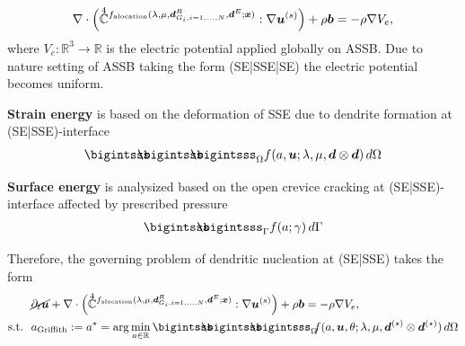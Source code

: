 \documentclass[25pt, a0paper,
portrait,
margin=2mm, 
innermargin=2mm, 
blockverticalspace=7mm, %
colspace=2mm, %
subcolspace=0mm]{tikzposter}
\begin{document}
{\begin{minipage}{0.43\textwidth}
\begin{mdframed}
\begin{align*}
				\nabla \cdot
				\Big(
				\accentset{\scriptstyle 4}{\mathbb{C}}^{f_{\text{alocation}}(\lambda,\mu,{\boldsymbol{\mathnormal d}}^{R}_{G_i, i=1,\dots,N},{\boldsymbol{\mathnormal d}}^{E};{\boldsymbol{\mathnormal x}})}
				:\nabla{\boldsymbol{\mathnormal u}}^{(s)}
				\Big)
				+ \rho{\boldsymbol{\mathnormal b}}
				= -\rho\nabla V_{e},
			\end{align*}
			where $V_{e}: \mathbb{R}^{3}\to\mathbb{R}$
			is the electric potential applied globally on ASSB.
			Due to nature setting of ASSB taking the form 
			(SE|SSE|SE)
			the electric potential becomes uniform.\\
			\vspace{-0.6cm}
		\end{mdframed}
		\begin{minipage}{0.5\textwidth}
			\begin{mdframed}
				\textbf{Strain energy} is based on the 
				deformation of SSE
				due to dendrite formation 
				at (SE|SSE)-interface 
				\begin{align*}
					\bigintsss\!\!\!\!\!\!\bigintsss\!\!\!\!\!\!\bigintsss_{\Omega}
					f(a,\bm{u};\lambda,\mu,\bm{d}\otimes\bm{d}) \, d\Omega 
				\end{align*}
			\end{mdframed}
		\end{minipage}
		\hfill 
		\begin{minipage}{0.49\textwidth}
			\begin{mdframed}
				\textbf{Surface energy}
				is analysized based on
				the open crevice 
				cracking at (SE|SSE)-interface
				affected by prescribed pressure
				\begin{align*} 
					\bigintsss\!\!\!\!\!\!\bigintsss_{\Gamma} f(a;\gamma) \, d\Gamma
				\end{align*}
			\end{mdframed}
		\end{minipage}
		\begin{mdframed}
			Therefore, the governing problem of dendritic nucleation at (SE|SSE) takes the form
			\begin{align}
				 & 
				\cancel{\partial_{t}\bm{u}}
				+
				\nabla \cdot
				\Big(
				\accentset{\scriptstyle 4}{\mathbb{C}}^{f_{\text{alocation}}(\lambda,\mu,\Bd^{R}_{G_i, i=1,\dots,N},\Bd^{E};\Bx)}
				:\nabla\Bu^{(s)}
				\Big)
				+ \rho\Bb
				= -\rho\nabla V_{e}, \\
				\text{s.t.}\ \
				 & 
				a_{\text{Griffith}} := a^{*}
				= \arg\min_{a\in\mathbb{R}}
				{
					\bigintsss\!\!\!\!\!\!\bigintsss\!\!\!\!\!\!\bigintsss_{\Omega}
					\!\!
					f(a,\bm{u},\theta;\lambda,\mu,\bm{d}^{(\star)}\otimes\bm{d}^{(\star)}) \, d\Omega
}
\end{align}
\end{mdframed}
\end{minipage}}
\end{document}

